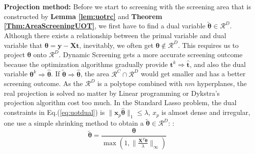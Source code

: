 \documentclass[twoside]{article}
\theoremstyle{plain}
\newcommand{\mat}[1]{\mathbf{#1}}
\renewcommand{\vec}[1]{\bm{#1}}
\newcommand{\changeHK}[1]{\textcolor{red}{#1}}
\begin{document}
{\bf Projection method:}
Before we start to screening with the screening area that is constructed by {\bf Lemma \ref{lem:uotrc}} and {\bf Theorem \ref{Thm:AreaScreeningUOT}}, we first have to find a dual variable $\tilde{\vec{\theta}}\in\mathcal{R}^{D}$. Although there exists a relationship between the primal variable and dual variable that $\vec{\theta} = \vec{y} - \mat{X}\vec{t}$, inevitably, we often get $\vec{\theta} \notin \mathcal{R}^{D}$. This requires us to project $\vec{\theta}$ onto $\mathcal{R}^{D}$.  Dynamic Screening gets a more accurate screening outcome because the optimization algorithms gradually provide $\vec t^{k} \Rightarrow \hat{\vec t}$, and also the dual variable $\vec \theta^{k} \Rightarrow \hat{\vec \theta}$. If $\vec{ \tilde{\theta}}\Rightarrow \hat{\vec \theta}$, the area $\mathcal{R}^{C}\cap\mathcal{R}^{D}$ would get smaller and has a better screening outcome. As the $\mathcal{R}^{D}$ is a polytope combined with $nm$ hyperplanes, the real projection is solved no matter by Linear programming or Dykstra's projection algorithm cost too much. In the Standard Lasso problem, the dual constraints in {Eq.(\ref{eq:uotdual})} is $\|\vec{x}_p \hat{\vec{\theta}}\|_1\leq \lambda$, $x_p$ is almost dense and irregular, one use a  simple shrinking method to obtain a $\tilde{\vec{\theta}} \in \mathcal{R}^{D}$:
\changeHK{\cite{xxxxx}}: 
\begin{equation*}
\tilde{\vec{\theta}} = \frac{\vec\theta}{\max(1, \|\frac{\mat{X}^T\vec\theta}{\lambda}\|_{\infty})}
\end{equation*}
\end{document}
